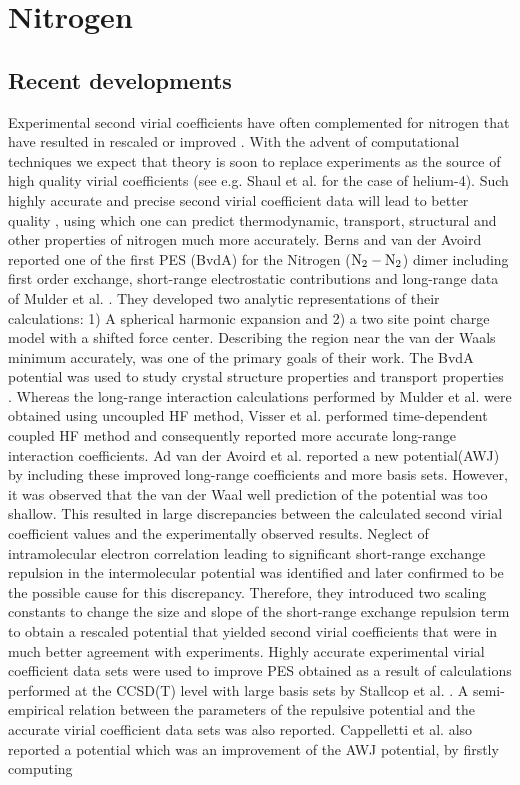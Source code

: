 \chapter{Nitrogen}
\label{chap:n2}
\section{Recent developments}
            Experimental second virial coefficients have often complemented \abinitio{} \PESs{} for nitrogen that have resulted in rescaled or improved \PESs{}. With the advent of computational techniques we expect that theory is soon to replace experiments as the source of high quality virial coefficients (see e.g. Shaul et al. \cite{Shaul2012SC} for the case of helium-4). Such highly accurate and precise second virial coefficient data will lead to better quality \PESs{}, using which one can predict thermodynamic, transport, structural and other properties of nitrogen much more accurately. Berns and van der Avoird \cite{Berns1980} reported one of the first \abinitio{} PES (BvdA) for the Nitrogen (${\rm N_2 - N_2}$) dimer including first order exchange, short-range electrostatic contributions and long-range data of Mulder et al. \cite{Mulder1980}. They developed two analytic representations of their calculations: 1) A spherical harmonic expansion and 2) a two site point charge model with a shifted force center. Describing the region near the van der Waals minimum accurately, was one of the primary goals of their work. The BvdA potential was used to study crystal structure properties \cite{Luty1980} and transport properties \cite{Nyeland1984}. Whereas the long-range interaction calculations performed by Mulder et al. \cite{Mulder1980} were obtained using uncoupled HF method, Visser et al. \cite{Visser1983} performed time-dependent coupled HF method and consequently reported more accurate long-range interaction coefficients. Ad van der Avoird et al. \cite{vanDerAvoird1986} reported a new potential(AWJ) by including these improved long-range coefficients and more basis sets. However, it was observed that the van der Waal well prediction of the potential was too shallow. This resulted in large discrepancies between the calculated second virial coefficient values and the experimentally observed results. Neglect of intramolecular electron correlation leading to significant short-range exchange repulsion in the intermolecular potential was identified and later confirmed to be the possible cause for this discrepancy. Therefore, they introduced two scaling constants to change the size and slope of the short-range exchange repulsion term to obtain a rescaled potential that yielded second virial coefficients that were in much better agreement with experiments. Highly accurate experimental virial coefficient data sets were used to improve \abinitio{} PES obtained as a result of calculations performed at the CCSD(T) level with large basis sets by Stallcop et al. \cite{Stallcop1997}. A semi-empirical relation between the parameters of the repulsive potential and the accurate virial coefficient data sets was also reported. Cappelletti et al. \cite{Cappelletti1998} also reported a potential which was an improvement of the AWJ potential, by firstly computing 